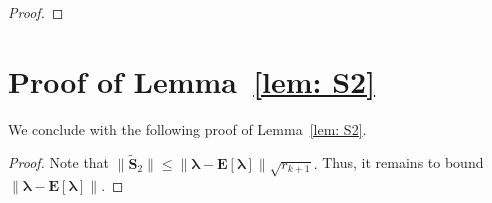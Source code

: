 \documentclass[twoside,11pt]{article}
\newcommand{\E}{\mathbf{E}}
\newcommand{\St}{\bs{\tilde S}}
\newcommand{\bs}{\boldsymbol}
\newcommand{\0}{\bs{0}}
\newcommand{\rbra}[1]{\ensuremath{\left( #1 \right)}} %
\newcommand{\bra}[1]{\ensuremath{\left\{ #1 \right\}}} %
\begin{document}
{\begin{proof}
\end{proof}

\section{Proof of  Lemma~\ref{lem: S2}} %
\label{A_S2_bound}

We conclude with the following proof of Lemma~\ref{lem: S2}.

\begin{proof}
Note that $\|\St_2 \| \le  \|\bs \lambda - \E[\bs \lambda] \| \sqrt{r_{k+1}}.$
Thus, it remains to bound $\|\bs \lambda - \E[\bs \lambda] \|$.


\end{proof}}
\end{document}
